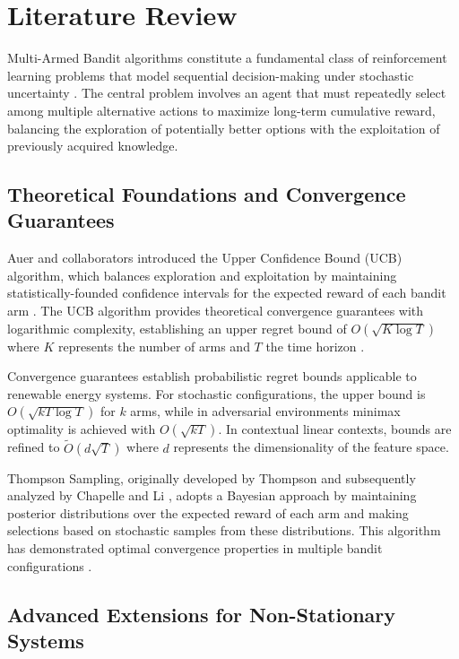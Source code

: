 \documentclass[conference]{IEEEtran}
\begin{document}
\section{Literature Review}

Multi-Armed Bandit algorithms constitute a fundamental class of reinforcement learning problems that model sequential decision-making under stochastic uncertainty \cite{auer2002}. The central problem involves an agent that must repeatedly select among multiple alternative actions to maximize long-term cumulative reward, balancing the exploration of potentially better options with the exploitation of previously acquired knowledge.

\subsection{Theoretical Foundations and Convergence Guarantees}

Auer and collaborators introduced the Upper Confidence Bound (UCB) algorithm, which balances exploration and exploitation by maintaining statistically-founded confidence intervals for the expected reward of each bandit arm \cite{auer2002}. The UCB algorithm provides theoretical convergence guarantees with logarithmic complexity, establishing an upper regret bound of $O(\sqrt{K \log T})$ where $K$ represents the number of arms and $T$ the time horizon \cite{srinivas2021}.

Convergence guarantees establish probabilistic regret bounds applicable to renewable energy systems. For stochastic configurations, the upper bound is $O(\sqrt{kT \log T})$ for $k$ arms, while in adversarial environments minimax optimality is achieved with $O(\sqrt{kT})$. In contextual linear contexts, bounds are refined to $\tilde{O}(d\sqrt{T})$ where $d$ represents the dimensionality of the feature space.

Thompson Sampling, originally developed by Thompson \cite{thompson1933} and subsequently analyzed by Chapelle and Li \cite{chapelle2011}, adopts a Bayesian approach by maintaining posterior distributions over the expected reward of each arm and making selections based on stochastic samples from these distributions. This algorithm has demonstrated optimal convergence properties in multiple bandit configurations \cite{bouneffouf2019}.

\subsection{Advanced Extensions for Non-Stationary Systems}
\end{document}
